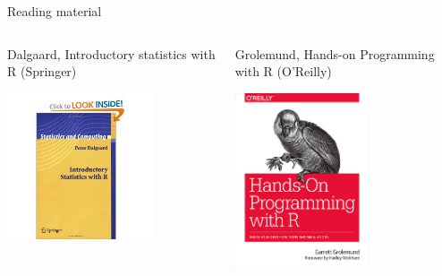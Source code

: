 \documentclass[aspectratio=169]{beamer}\usepackage[]{graphicx}\usepackage[]{color}
\begin{document}
\begin{frame}{Reading material}
\begin{columns}
  \begin{column}{0.5\textwidth}
    Dalgaard, Introductory statistics with R (Springer)
  	\begin{center}
			\includegraphics[width=0.7\textwidth]{./images/dalgaardbook.jpg}
		\end{center}
	\end{column}
	\begin{column}{0.5\textwidth}
    Grolemund, Hands-on Programming with R (O'Reilly)
		\begin{center}
			\includegraphics[width=0.6\textwidth]{./images/handsonR.png}
		\end{center}
	\end{column}
\end{columns}
\end{frame}
\end{document}
